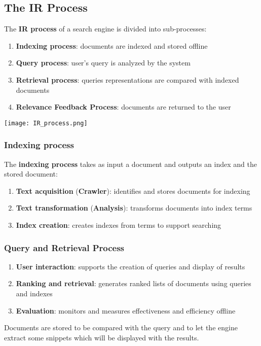\documentclass{article}
\begin{document}
\subsection{The IR Process}
The \textbf{IR process} of a search engine is divided into sub-processes:
\begin{enumerate}
    \item \textbf{Indexing process}: documents are indexed and stored offline
    \item \textbf{Query process}: user’s query is analyzed by the system
    \item \textbf{Retrieval process}: queries representations are compared with indexed documents
    \item \textbf{Relevance Feedback Process}: documents are returned to the user
\end{enumerate}
\begin{center}
    \texttt{[image: IR\_process.png]}\\
\end{center}
\subsubsection{Indexing process}
The \textbf{indexing process} takes as input a document and outputs an index and the stored document:
\begin{enumerate}
    \item \textbf{Text acquisition} (\textbf{Crawler}): identifies and stores documents for indexing
    \item \textbf{Text transformation} (\textbf{Analysis}): transforms documents into index terms
    \item \textbf{Index creation}: creates indexes from terms to support searching \\
\end{enumerate}
\subsubsection{Query and Retrieval Process}
\begin{enumerate}
    \item \textbf{User interaction}: supports the creation of queries and display of results
    \item \textbf{Ranking and retrieval}: generates ranked lists of documents using queries and indexes
    \item \textbf{Evaluation}: monitors and measures effectiveness and efficiency offline
\end{enumerate}
Documents are stored to be compared with the query and to let the engine extract some snippets which will be displayed with the results. \\
\end{document}
